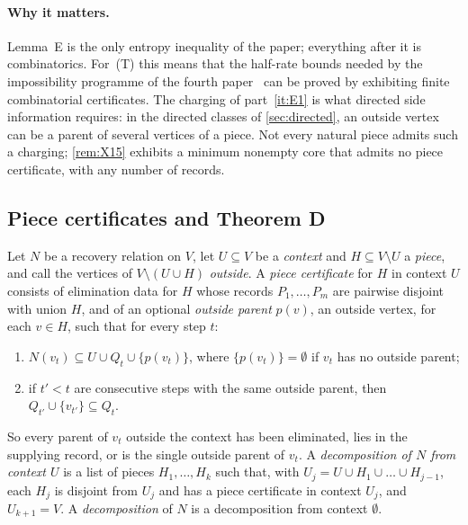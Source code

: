 \paragraph{Why it matters.} Lemma~E is the only entropy inequality of the paper; everything after it is combinatorics.
For~(T) this means that the half-rate bounds needed by the impossibility programme of the fourth
paper~\cite{FourthPaper2026} can be proved by exhibiting finite combinatorial certificates. The charging of
part~\ref{it:E1} is what directed side information requires: in the directed classes of \cref{sec:directed}, an outside
vertex can be a parent of several vertices of a piece. Not every natural piece admits such a charging; \cref{rem:X15}
exhibits a minimum nonempty core that admits no piece certificate, with any number of records.

\subsection{Piece certificates and Theorem D}\label{sec:thmD}

\begin{definition}\label{def:piece}
Let $N$ be a recovery relation on $V$, let $U\subseteq V$ be a \emph{context} and $H\subseteq V\setminus U$ a
\emph{piece}, and call the vertices of $V\setminus(U\cup H)$ \emph{outside}. A \emph{piece certificate} for $H$ in
context $U$ consists of elimination data for $H$ whose records $P_1,\dots,P_m$ are pairwise disjoint with union $H$,
and of an optional \emph{outside parent} $p(v)$, an outside vertex, for each $v\in H$, such that for every step $t$:
\begin{enumerate}[label=(C\arabic*),leftmargin=3em]
\item\label{it:C1} $N(v_t)\subseteq U\cup Q_t\cup\{p(v_t)\}$, where $\{p(v_t)\}=\emptyset$ if $v_t$ has no outside
parent;
\item\label{it:C2} if $t'<t$ are consecutive steps with the same outside parent, then
$Q_{t'}\cup\{v_{t'}\}\subseteq Q_t$.
\end{enumerate}
So every parent of $v_t$ outside the context has been eliminated, lies in the supplying record, or is the single
outside parent of $v_t$. A \emph{decomposition of $N$ from context $U$} is a list of pieces $H_1,\dots,H_k$ such that,
with $U_j=U\cup H_1\cup\dots\cup H_{j-1}$, each $H_j$ is disjoint from $U_j$ and has a piece certificate in context
$U_j$, and $U_{k+1}=V$. A \emph{decomposition} of $N$ is a decomposition from context $\emptyset$.
\end{definition}

